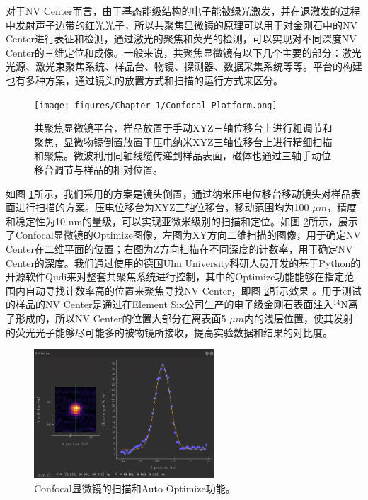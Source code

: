 \documentclass[type = bachelor]{whu-thesis}
\begin{document}
对于NV Center而言，由于基态能级结构的电子能被绿光激发，并在退激发的过程中发射声子边带的红光光子，所以共聚焦显微镜的原理可以用于对金刚石中的NV Center进行表征和检测，通过激光的聚焦和荧光的检测，可以实现对不同深度NV Center的三维定位和成像。一般来说，共聚焦显微镜有以下几个主要的部分：激光光源、激光束聚焦系统、样品台、物镜、探测器、数据采集系统等等。平台的构建也有多种方案，通过镜头的放置方式和扫描的运行方式来区分。
\begin{figure}
  \centering
  \texttt{[image: figures/Chapter 1/Confocal Platform.png]}
  \caption[共聚焦显微镜平台]{共聚焦显微镜平台，样品放置于手动XYZ三轴位移台上进行粗调节和聚焦，显微物镜倒置放置于压电纳米XYZ三轴位移台上进行精细扫描和聚焦。微波利用同轴线缆传递到样品表面，磁体也通过三轴手动位移台调节与样品的相对位置。}
  \label{fig: Confocal Platform}
\end{figure}
如图 \ref{fig: Confocal Platform}所示，我们采用的方案是镜头倒置，通过纳米压电位移台移动镜头对样品表面进行扫描的方案。压电位移台为XYZ三轴位移台，移动范围均为100 $\mu m$，精度和稳定性为10 nm的量级，可以实现亚微米级别的扫描和定位。如图 \ref{fig: Confocal Optimizer}所示，展示了Confocal显微镜的Optimize图像，左图为XY方向二维扫描的图像，用于确定NV Center在二维平面的位置；右图为Z方向扫描在不同深度的计数率，用于确定NV Center的深度。我们通过使用的德国Ulm University科研人员开发的基于Python的开源软件Qudi来对整套共聚焦系统进行控制，其中的Optimize功能能够在指定范围内自动寻找计数率高的位置来聚焦寻找NV Center，即图 \ref{fig: Confocal Optimizer}所示效果 \cite{binder2017qudi}。用于测试的样品的NV Center是通过在Element Six公司生产的电子级金刚石表面注入$^{14}$N离子形成的，所以NV Center的位置大部分在离表面5 $\mu m$内的浅层位置，使其发射的荧光光子能够尽可能多的被物镜所接收，提高实验数据和结果的对比度。
\begin{figure}
  \centering
  \includegraphics[width=0.6\textwidth]{figures/Chapter 1/Confocal Optimizer.png}
  \caption[Confocal显微镜的扫描和Auto Optimize功能]{Confocal显微镜的扫描和Auto Optimize功能。}
  \label{fig: Confocal Optimizer}
\end{figure}
\end{document}
